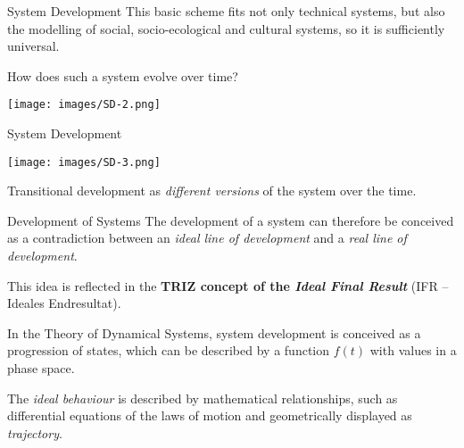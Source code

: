 \documentclass{beamer}
\begin{document}
\begin{frame}{System Development}
  This basic scheme fits not only technical systems, but also the modelling of
  social, socio-ecological and cultural systems, so it is sufficiently
  universal.

How does such a system evolve over time?
\begin{center}
  \texttt{[image: images/SD-2.png]}
\end{center}
\end{frame}

\begin{frame}{System Development}
\begin{center}
  \texttt{[image: images/SD-3.png]}
\end{center}
Transitional development as \emph{different versions} of the system over the
time.
\end{frame}


\begin{frame}{Development of Systems}
  The development of a system can therefore be conceived as a contradiction
  between an \emph{ideal line of development} and a \emph{real line of
    development}.

This idea is reflected in the \textbf{TRIZ concept of the \emph{Ideal Final
    Result}} (IFR -- Ideales Endresultat).

In the Theory of Dynamical Systems, system development is conceived as a
progression of states, which can be described by a function $f(t)$ with values
in a phase space.

The \emph{ideal behaviour} is described by mathematical relationships, such as
differential equations of the laws of motion and geometrically displayed as
\emph{trajectory}. 

\end{frame}
\end{document}
